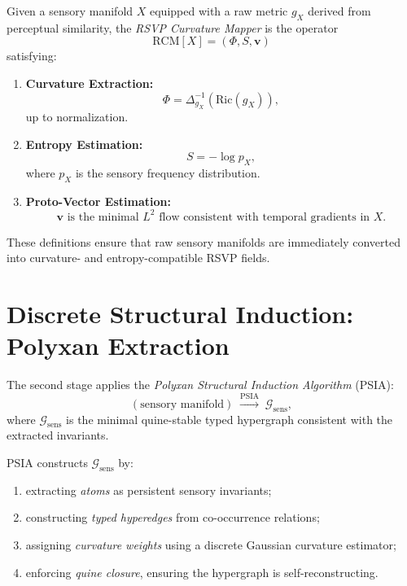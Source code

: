 \begin{definition}\label{def:46-rcm}
Given a sensory manifold $X$ equipped with a raw metric $g_X$ derived from perceptual similarity, the \emph{RSVP Curvature Mapper} is the operator
\[
\mathrm{RCM}[X] = (\Phi, S, \mathbf{v})
\]
satisfying:
\begin{enumerate}
\item \textbf{Curvature Extraction:}
\[
\Phi = \Delta^{-1}_{g_X}\!\left(\mathrm{Ric}(g_X)\right),
\]
up to normalization.

\item \textbf{Entropy Estimation:}
\[
S = -\log p_X,
\]
where $p_X$ is the sensory frequency distribution.

\item \textbf{Proto-Vector Estimation:}
\[
\mathbf{v}
\text{ is the minimal } L^2 \text{ flow consistent with temporal gradients in } X.
\]
\end{enumerate}
\end{definition}

These definitions ensure that raw sensory manifolds are immediately converted into curvature- and entropy-compatible RSVP fields.

\section{Discrete Structural Induction: Polyxan Extraction}

The second stage applies the \emph{Polyxan Structural Induction Algorithm} (PSIA):
\[
(\text{sensory manifold})
\;\xrightarrow{\mathrm{PSIA}}\;
\mathcal{G}_{\mathrm{sens}},
\]
where $\mathcal{G}_{\mathrm{sens}}$ is the minimal quine-stable typed hypergraph consistent with the extracted invariants.

\begin{definition}\label{def:46-psia}
PSIA constructs $\mathcal{G}_{\mathrm{sens}}$ by:
\begin{enumerate}
\item extracting \emph{atoms} as persistent sensory invariants;
\item constructing \emph{typed hyperedges} from co-occurrence relations;
\item assigning \emph{curvature weights} using a discrete Gaussian curvature estimator;
\item enforcing \emph{quine closure}, ensuring the hypergraph is self-reconstructing.
\end{enumerate}
\end{definition}

